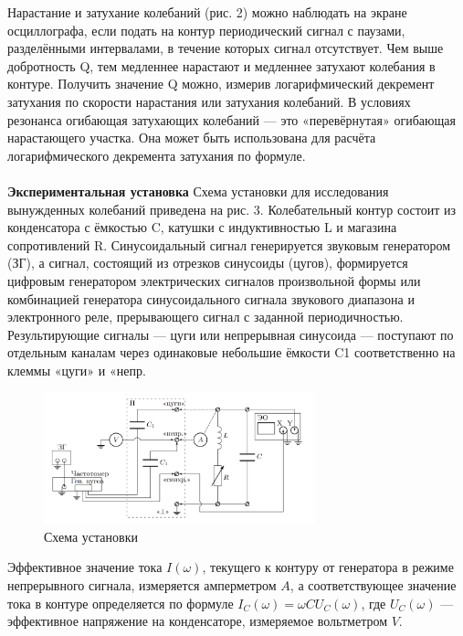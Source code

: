 \documentclass[12pt,a4paper]{article}
\begin{document}
Нарастание и затухание колебаний (рис. 2) можно наблюдать на экране осциллографа, если подать на контур периодический сигнал с паузами, разделёнными интервалами, в течение которых сигнал отсутствует.
Чем выше добротность Q, тем медленнее нарастают и медленнее затухают колебания в контуре. Получить значение Q можно, измерив логарифмический декремент затухания по скорости нарастания или затухания колебаний. В условиях резонанса огибающая затухающих колебаний
— это «перевёрнутая» огибающая нарастающего участка. Она может быть использована для расчёта логарифмического
декремента затухания по формуле. \\\\
\textbf{Экспериментальная установка}
Схема установки для исследования вынужденных колебаний приведена на рис. 3. Колебательный контур состоит из конденсатора с ёмкостью C, катушки с индуктивностью L и магазина сопротивлений R.
Синусоидальный сигнал генерируется звуковым генератором (ЗГ), а сигнал, состоящий из отрезков синусоиды (цугов), формируется цифровым
генератором электрических сигналов произвольной формы или комбинацией генератора синусоидального сигнала звукового диапазона и электронного реле, прерывающего сигнал с заданной периодичностью. Результирующие сигналы — цуги или непрерывная синусоида — поступают
по отдельным каналам через одинаковые небольшие ёмкости C1 соответственно на клеммы «цуги» и «непр.

\begin{figure}[h!]
	\begin{center}
		\includegraphics[width = 0.7\textwidth]{ust2.png}
		\caption{Схема установки}
		\label{fig:facility}
	\end{center}
\end{figure}


Эффективное значение тока \( I(\omega) \), текущего к контуру от генератора в режиме непрерывного сигнала, измеряется амперметром \( A \), а соответствующее значение тока в контуре определяется по формуле \( I_C(\omega) = \omega C U_C(\omega) \), где \( U_C(\omega) \) — эффективное напряжение на конденсаторе, измеряемое вольтметром \( V \).
\end{document}
